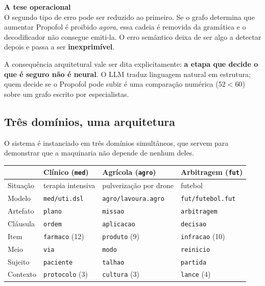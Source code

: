 \documentclass[11pt,a4paper]{article}
\newcommand{\destaque}[2]{%
  \begin{center}
  \begin{minipage}{0.95\linewidth}
  \setlength{\fboxsep}{8pt}%
  \colorbox{corNovoFundo}{%
    \begin{minipage}{\dimexpr\linewidth-16pt\relax}
    \textbf{\textcolor{corNovo}{#1}}\\[2pt]#2
    \end{minipage}}
  \end{minipage}
  \end{center}
}
\newcommand{\arq}[1]{\texttt{\small #1}}
\begin{document}
\vspace{2mm}

\destaque{A tese operacional}{%
O segundo tipo de erro pode ser reduzido ao primeiro. Se o grafo determina que
aumentar Propofol é proibido \emph{agora}, essa cadeia é removida da gramática e
o decodificador não consegue emiti-la. O erro semântico deixa de ser algo a
detectar depois e passa a ser \textbf{inexprimível}.}

A consequência arquitetural vale ser dita explicitamente: \textbf{a etapa que
decide o que é seguro não é neural}. O LLM traduz linguagem natural em
estrutura; quem decide se o Propofol pode subir é uma comparação numérica
($52 < 60$) sobre um grafo escrito por especialistas.

\subsection{Três domínios, uma arquitetura}

O sistema é instanciado em três domínios simultâneos, que servem para demonstrar
que a maquinaria não depende de nenhum deles.

\begin{center}
\small
\begin{tabular}{@{}llll@{}}
\toprule
& \textbf{Clínico (\texttt{med})} & \textbf{Agrícola (\texttt{agro})} & \textbf{Arbitragem (\texttt{fut})}\\
\midrule
Situação  & terapia intensiva     & pulverização por drone  & futebol\\
Modelo    & \arq{med/uti.dsl}     & \arq{agro/lavoura.agro} & \arq{fut/futebol.fut}\\
Artefato  & \texttt{plano}        & \texttt{missao}         & \texttt{arbitragem}\\
Cláusula  & \texttt{ordem}        & \texttt{aplicacao}      & \texttt{decisao}\\
Item      & \texttt{farmaco} (12) & \texttt{produto} (9)    & \texttt{infracao} (10)\\
Meio      & \texttt{via}          & \texttt{modo}           & \texttt{reinicio}\\
Sujeito   & \texttt{paciente}     & \texttt{talhao}         & \texttt{partida}\\
Contexto  & \texttt{protocolo} (3)& \texttt{cultura} (3)    & \texttt{lance} (4)\\
\bottomrule
\end{tabular}
\end{center}
\end{document}
